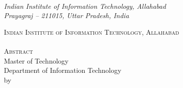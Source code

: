 \begin{singlespacing}
\vspace{4mm}
\begin{center}
    \textbf{\deptname}\\
    \textit{Indian Institute of Information Technology, Allahabad}\\
    \textit{Prayagraj -- 211015, Uttar Pradesh, India}
\end{center}
\end{singlespacing}


\clearpage
\thispagestyle{plain}

\begin{center}
    \textsc{Indian Institute of Information Technology, Allahabad}\\[5mm]
    {\large\bfseries \ttitle}\\[5mm]
    \textsc{Abstract}\\[3mm]
    Master of Technology\\
    Department of Information Technology\\[3mm]
    by \studentonename
\end{center}

